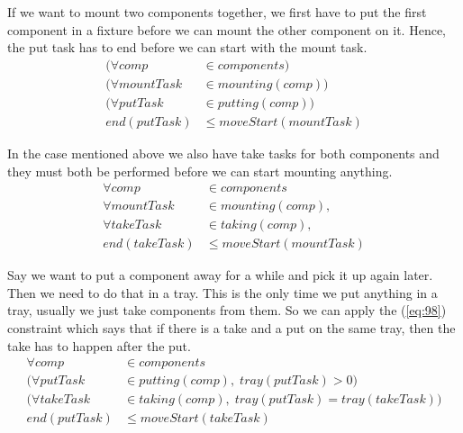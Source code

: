  \noindent If we want to mount two components together, we first have to put the first component in a fixture before we can mount the other component on it. Hence, the put task has to end before we can start with the mount task. 
 \begin{equation}
 \begin{aligned}\label{eq:96}
 (\forall comp &\in components) \\
 (\forall mountTask &\in mounting(comp)) \\
 (\forall putTask &\in putting(comp)) \\
 end(putTask) &\le moveStart(mountTask)
 \end{aligned}
 \end{equation}

  \noindent In the case mentioned above we also have take tasks for both components and they must both be performed before we can start mounting anything.
 \begin{equation}
 \begin{aligned}\label{eq:97}
 \forall comp &\in components \\
 \forall mountTask &\in mounting(comp), \\
 \forall takeTask &\in taking(comp), \\
 end(takeTask) &\le moveStart(mountTask)
 \end{aligned}
 \end{equation}

  \noindent Say we want to put a component away for a while and pick it up again later. Then we need to do that in a tray. This is the only time we put anything in a tray, usually we just take components from them. So we can apply the (\ref{eq:98}) constraint which says that if there is a take and a put on the same tray, then the take has to happen after the put. 
 \begin{equation}
 \begin{aligned}\label{eq:98}
 \forall comp &\in components \\
 (\forall putTask &\in putting(comp), \; tray(putTask) > 0)\\
 (\forall takeTask &\in taking(comp), \; tray(putTask) = tray(takeTask))\\
 end(putTask) &\le moveStart(takeTask)
 \end{aligned}
 \end{equation}

